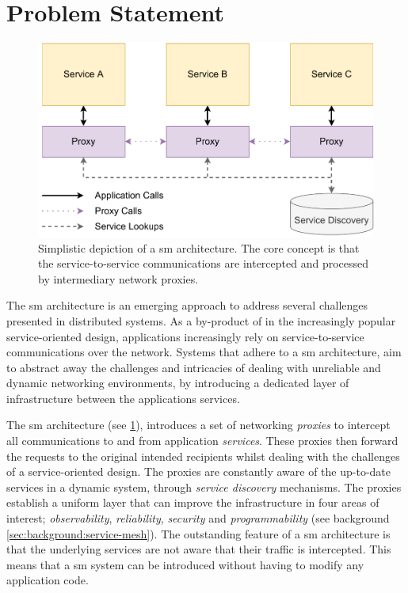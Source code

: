 \section{Problem Statement}
\label{sec:introduction:problem-statement}


\begin{figure}[!t]
    \centering
    
    \includegraphics[width=.8\linewidth]{1_introduction/figures/service-mesh-architecture-simple.pdf}

    \caption[Simplistic depiction of a \gls{sm} architecture.]{Simplistic depiction of a \gls{sm} architecture. The core concept is that the service-to-service communications are intercepted and processed by intermediary network proxies.}
    \label{fig:service-mesh-architecture-simplified}
\end{figure}

The \gls{sm} architecture is an emerging approach to address several challenges presented in distributed systems. As a by-product of in the increasingly popular service-oriented design, applications increasingly rely on service-to-service communications over the network. Systems that adhere to a \gls{sm} architecture, aim to abstract away the challenges and intricacies of dealing with unreliable and dynamic networking environments, by introducing a dedicated layer of infrastructure between the applications services. 

The \gls{sm} architecture (see \cref{fig:service-mesh-architecture-simplified}), introduces a set of networking \textit{proxies} to intercept all communications to and from application \textit{services}. These proxies then forward the requests to the original intended recipients whilst dealing with the challenges of a service-oriented design. The proxies are constantly aware of the up-to-date services in a dynamic system, through \textit{service discovery} mechanisms. The proxies establish a uniform layer that can improve the infrastructure in four areas of interest; \textit{observability}, \textit{reliability}, \textit{security} and \textit{programmability} (see background \cref{sec:background:service-mesh}). The outstanding feature of a \gls{sm} architecture is that the underlying services are not aware that their traffic is intercepted. This means that a \gls{sm} system can be introduced without having to modify any application code.

